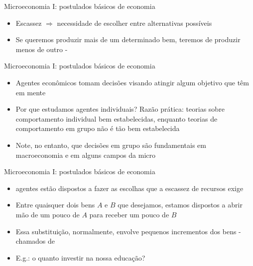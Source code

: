 \documentclass[10pt]{beamer}
\begin{document}
\begin{frame}
    {Microeconomia I: postulados básicos de economia}
    \begin{itemize}
        \item Escassez $\Rightarrow$ necessidade de escolher entre alternativas possíveis \bigskip
        \item Se queremos produzir mais de um determinado bem, teremos de produzir menos de outro - 
    \end{itemize}
\end{frame}

\begin{frame}
    {Microeconomia I: postulados básicos de economia}
    \begin{itemize}
        \item Agentes econômicos tomam decisões visando atingir algum objetivo que têm em mente \bigskip
        \item Por que estudamos agentes individuais? Razão prática: teorias sobre comportamento individual bem estabelecidas, enquanto teorias de comportamento em grupo não é tão bem estabelecida \bigskip
        
        \item[\emoji{warning}] Note, no entanto, que decisões em grupo são fundamentais em macroeconomia e em alguns campos da micro
    \end{itemize}
\end{frame}

\begin{frame}
    {Microeconomia I: postulados básicos de economia}
    \begin{itemize}
        \item {} agentes estão dispostos a fazer as escolhas que a escassez de recursos exige \bigskip
        \item Entre quaisquer dois bens $A$ e $B$ que desejamos, estamos dispostos a abrir mão de um pouco de $A$ para receber um pouco de $B$ \bigskip
        \item Essa substituição, normalmente, envolve pequenos incrementos dos bens - chamados de  \bigskip
        \item E.g.: o quanto investir na nossa educação?
    \end{itemize}
\end{frame}
\end{document}
